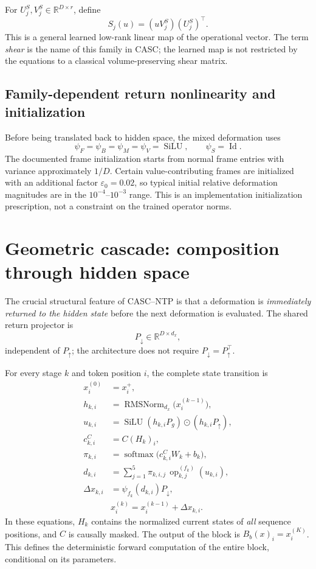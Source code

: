 \documentclass[11pt,a4paper]{article}
\newcommand{\R}{\mathbb{R}}
\newcommand{\rmsn}{\operatorname{RMSNorm}}
\newcommand{\SiLU}{\operatorname{SiLU}}
\newcommand{\softmax}{\operatorname{softmax}}
\newcommand{\up}{{\uparrow}}
\newcommand{\dn}{{\downarrow}}
\newcommand{\op}{\operatorname{op}}
\newcommand{\T}{\top}
\begin{document}
For $U_j^S,V_j^S\in\R^{D\times r}$, define
\begin{equation}
\boxed{S_j(u)=(uV_j^S)(U_j^S)^{\T}.}
\end{equation}
This is a general learned low-rank linear map of the operational vector. The term \emph{shear} is the name of this family in CASC; the learned map is not restricted by the equations to a
classical volume-preserving shear matrix.

\subsection{Family-dependent return nonlinearity and initialization}

Before being translated back to hidden space, the mixed deformation uses
\begin{equation}
\psi_F=\psi_B=\psi_M=\psi_V=\SiLU,\qquad \psi_S=\operatorname{Id}.
\end{equation}
The documented frame initialization starts from normal frame entries with variance approximately $1/D$.
Certain value-contributing frames are initialized with an additional factor $\varepsilon_0=0.02$, so typical initial relative deformation magnitudes are in the
$10^{-4}$--$10^{-3}$ range. This is an implementation initialization prescription, not a constraint on the
trained operator norms.

\section{Geometric cascade: composition through hidden space}

The crucial structural feature of CASC--NTP is that a deformation is \emph{immediately returned to the
hidden state} before the next deformation is evaluated. The shared return projector is
\begin{equation}
P_\dn\in\R^{D\times d_x},
\end{equation}
independent of $P_\up$; the architecture does not require $P_\dn=P_\up^{\T}$.

For every stage $k$ and token position $i$, the complete state transition is
\begin{align}
x_i^{(0)}&=x_i^{+},\\
h_{k,i}&=\rmsn_{d_x}\bigl(x_i^{(k-1)}\bigr),\\
u_{k,i}&=\SiLU(h_{k,i}P_g)\odot(h_{k,i}P_\up),\\
c_{k,i}^C&=C(H_k)_i,\\
\pi_{k,i}&=\softmax\bigl(c_{k,i}^CW_k+b_k\bigr),\\
d_{k,i}&=\sum_{j=1}^{5}\pi_{k,i,j}\,\op_{k,j}^{(f_k)}(u_{k,i}),\label{eq:mixture}\\
\Delta x_{k,i}&=\psi_{f_k}(d_{k,i})P_\dn,\\
&\boxed{x_i^{(k)}=x_i^{(k-1)}+\Delta x_{k,i}.}
\end{align}
In these equations, $H_k$ contains the normalized current states of \emph{all} sequence positions, and $C$
is causally masked. The output of the block is $B_b(x)_i=x_i^{(K)}$. This defines the deterministic
forward computation of the entire block, conditional on its parameters.
\end{document}
